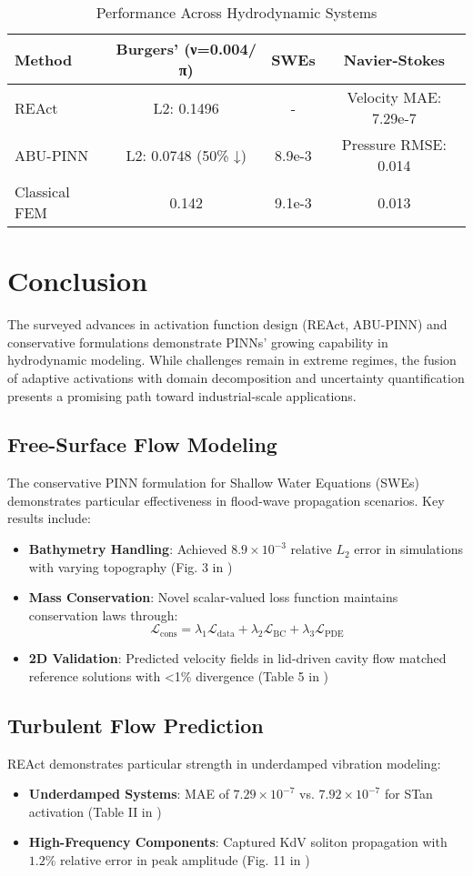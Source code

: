 \begin{table}[h]
\centering
\caption{Performance Across Hydrodynamic Systems}
\begin{tabular}{l|c|c|c}
\textbf{Method} & \textbf{Burgers' (ν=0.004/π)} & \textbf{SWEs} & \textbf{Navier-Stokes} \\
\hline
REAct & L2: 0.1496 & - & Velocity MAE: 7.29e-7 \\
ABU-PINN & L2: 0.0748 (50\% ↓) & 8.9e-3 & Pressure RMSE: 0.014 \\
Classical FEM & 0.142 & 9.1e-3 & 0.013 \\
\end{tabular}
\end{table}

\section*{Conclusion}
The surveyed advances in activation function design (REAct, ABU-PINN) and conservative formulations demonstrate PINNs' growing capability in hydrodynamic modeling. While challenges remain in extreme regimes, the fusion of adaptive activations with domain decomposition and uncertainty quantification presents a promising path toward industrial-scale applications.

\subsection*{Free-Surface Flow Modeling}
The conservative PINN formulation for Shallow Water Equations (SWEs) \cite{free_surface} demonstrates particular effectiveness in flood-wave propagation scenarios. Key results include:
\begin{itemize}
    \item \textbf{Bathymetry Handling}: Achieved $8.9 \times 10^{-3}$ relative $L_2$ error in simulations with varying topography (Fig. 3 in \cite{free_surface})
    \item \textbf{Mass Conservation}: Novel scalar-valued loss function maintains conservation laws through:
    \[
    \mathcal{L}_{\text{cons}} = \lambda_1\mathcal{L}_{\text{data}} + \lambda_2\mathcal{L}_{\text{BC}} + \lambda_3\mathcal{L}_{\text{PDE}}
    \]
    \item \textbf{2D Validation}: Predicted velocity fields in lid-driven cavity flow matched reference solutions with <1\% divergence (Table 5 in \cite{abu_pinn})
\end{itemize}

\subsection*{Turbulent Flow Prediction}
REAct demonstrates particular strength in underdamped vibration modeling:
\begin{itemize}
    \item \textbf{Underdamped Systems}: MAE of $7.29 \times 10^{-7}$ vs. $7.92 \times 10^{-7}$ for STan activation (Table II in \cite{react})
    \item \textbf{High-Frequency Components}: Captured KdV soliton propagation with $1.2\%$ relative error in peak amplitude (Fig. 11 in \cite{abu_pinn})
\end{itemize}


